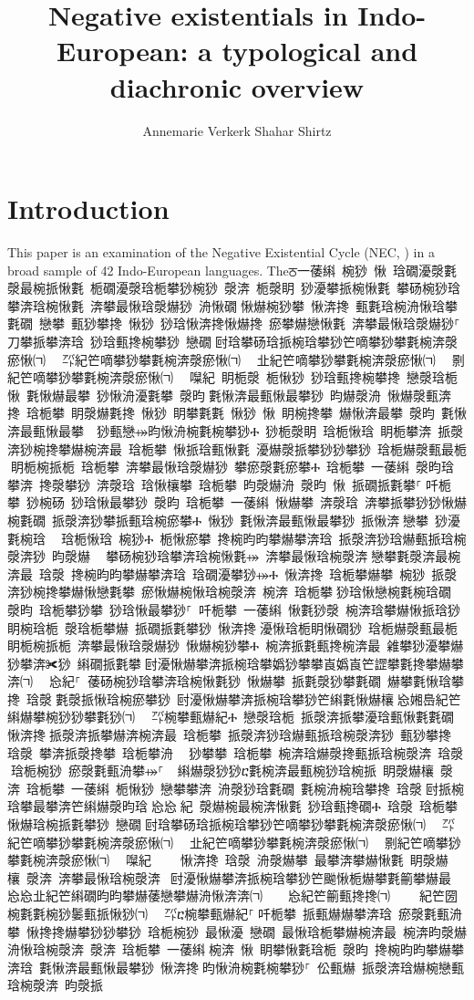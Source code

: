 ﻿\documentclass[output=paper]{langsci/langscibook}
\title{Negative existentials in Indo-European: a typological and diachronic overview}
\author{Annemarie Verkerk\affiliation{Max Planck Institute for the Science
of Human History\\ Universität des Saarlandes}\lastand
Shahar Shirtz\affiliation{University of Oregon}%
}
\begin{document}
\section{Introduction}\label{sec:ieur-1}

This paper is an examination of the Negative Existential Cycle (NEC,
\citealt{Croft1991}) in a broad sample of 42
Indo-European languages. Theਠ一䔀䌀 椀猀 愀 琀礀瀀漀氀漀最椀挀愀氀 栀礀瀀漀琀栀攀猀椀猀 漀渀 栀漀眀 猀瀀攀挀椀愀氀 攀砀椀猀琀攀渀琀椀愀氀 渀攀最愀琀漀爀猀 洀愀礀਀愀爀椀猀攀 愀渀搀 甀氀琀椀洀愀琀攀氀礀 戀攀 甀猀攀搀 愀猀 猀琀愀渀搀愀爀搀 瘀攀爀戀愀氀 渀攀最愀琀漀爀猀⸀ 刀攀挀攀渀琀 猀琀甀搀椀攀猀 戀礀਀尀琀攀砀琀挀椀琀攀猀笀嘀攀猀攀氀椀渀漀瘀愀㈀　㄀㌀紀笀嘀攀猀攀氀椀渀漀瘀愀㈀　㄀㐀紀笀嘀攀猀攀氀椀渀漀瘀愀㈀　㄀㔀紀笀嘀攀猀攀氀椀渀漀瘀愀㈀　㄀㘀紀 眀栀漀 栀愀猀 猀琀甀搀椀攀搀 戀漀琀栀 愀 氀愀爀最攀 猀愀洀瀀氀攀 漀昀਀氀愀渀最甀愀最攀猀 昀爀漀洀 愀爀漀甀渀搀 琀栀攀 眀漀爀氀搀 愀猀 眀攀氀氀 愀猀 愀 眀椀搀攀 爀愀渀最攀 漀昀 氀愀渀最甀愀最攀਀⠀猀甀戀⤀昀愀洀椀氀椀攀猀Ⰰ 猀栀漀眀 琀栀愀琀 眀栀攀渀 挀漀渀猀椀搀攀爀椀渀最 琀栀攀 愀挀琀甀愀氀 瀀爀漀挀攀猀猀攀猀 琀栀爀漀甀最栀਀眀栀椀挀栀 琀栀攀 渀攀最愀琀漀爀猀 攀瘀漀氀瘀攀Ⰰ 琀栀攀 一䔀䌀 漀昀琀攀渀 搀漀攀猀 渀漀琀 琀愀欀攀 琀栀攀 昀漀爀洀 漀昀 愀 挀礀挀氀攀⸀਀吀栀攀 猀椀砀 猀琀愀最攀猀 漀昀 琀栀攀 一䔀䌀 愀爀攀 渀漀琀 渀攀挀攀猀猀愀爀椀氀礀 挀漀渀猀攀挀甀琀椀瘀攀Ⰰ 愀猀 氀愀渀最甀愀最攀猀 挀愀渀਀戀攀 猀瀀氀椀琀 ⠀琀栀愀琀 椀猀Ⰰ 栀愀瘀攀 搀椀昀昀攀爀攀渀琀 挀漀渀猀琀爀甀挀琀椀漀渀猀 昀漀爀 ⠀攀砀椀猀琀攀渀琀椀愀氀⤀ 渀攀最愀琀椀漀渀਀戀攀氀漀渀最椀渀最 琀漀 搀椀昀昀攀爀攀渀琀 琀礀瀀攀猀⤀Ⰰ 愀渀搀 琀栀攀爀攀 椀猀 挀漀渀猀椀搀攀爀愀戀氀攀 瘀愀爀椀愀琀椀漀渀 椀渀 琀栀攀਀猀琀愀戀椀氀椀琀礀 漀昀 琀栀攀猀攀 猀琀愀最攀猀⸀ 吀栀攀 一䔀䌀 愀氀猀漀 椀渀琀攀爀愀挀琀猀 眀椀琀栀 漀琀栀攀爀 挀礀挀氀攀猀 愀渀搀਀瀀愀琀栀眀愀礀猀 琀栀爀漀甀最栀 眀栀椀挀栀 渀攀最愀琀漀爀猀 愀爀椀猀攀Ⰰ 椀渀挀氀甀搀椀渀最 䨀攀猀瀀攀爀猀攀渀✀猀 䌀礀挀氀攀਀尀瀀愀爀攀渀挀椀琀攀嬀猀攀攀崀嬀崀笀䜀攀氀搀攀爀攀渀㈀　㄀㤀紀⸀ 䔀砀椀猀琀攀渀琀椀愀氀猀 愀爀攀 挀氀漀猀攀氀礀 爀攀氀愀琀攀搀 琀漀਀氀漀挀愀琀椀瘀攀猀 尀瀀愀爀攀渀挀椀琀攀猀笀䌀氀愀爀欀㄀㤀㜀㠀紀笀䌀爀攀椀猀猀攀氀猀㈀　㄀㌀椀攀甀爀紀Ⰰ 戀漀琀栀 挀漀渀挀攀瀀琀甀愀氀氀礀 愀渀搀਀挀漀渀挀攀爀渀椀渀最 琀栀攀 挀漀渀猀琀爀甀挀琀椀漀渀猀 甀猀攀搀 琀漀 攀渀挀漀搀攀 琀栀攀洀 ⠀猀攀攀 琀栀攀 椀渀琀爀漀搀甀挀琀椀漀渀 琀漀਀琀栀椀猀 瘀漀氀甀洀攀⤀⸀ ਀਀䌀爀漀猀猀ⴀ氀椀渀最甀椀猀琀椀挀 眀漀爀欀 漀渀 琀栀攀 一䔀䌀 栀愀猀 戀攀攀渀 洀漀猀琀氀礀 氀椀洀椀琀攀搀 琀漀਀尀挀椀琀攀最攀渀笀䌀爀漀昀琀㄀㤀㤀㄀紀 漀爀椀最椀渀愀氀 猀琀甀搀礀Ⰰ 琀漀 琀栀攀 愀爀琀椀挀氀攀猀 戀礀਀尀琀攀砀琀挀椀琀攀猀笀嘀攀猀攀氀椀渀漀瘀愀㈀　㄀㌀紀笀嘀攀猀攀氀椀渀漀瘀愀㈀　㄀㐀紀笀嘀攀猀攀氀椀渀漀瘀愀㈀　㄀㔀紀笀嘀攀猀攀氀椀渀漀瘀愀㈀　㄀㘀紀਀    愀渀搀 琀漀 洀漀爀攀 最攀渀攀爀愀氀 眀漀爀欀 漀渀 渀攀最愀琀椀漀渀 ਀尀瀀愀爀攀渀挀椀琀攀猀笀䬀愀栀爀攀氀䈀攀爀最㄀㤀㤀㐀紀笀䌀礀昀昀攀爀䔀戀攀爀洀愀渀渀㈀　　㤀紀笀䈀甀搀搀㈀　㄀　紀笀圀椀氀氀椀猀䰀甀挀愀猀㈀　㄀㌀ⴀ椀攀甀爀紀⸀਀吀栀攀 挀甀爀爀攀渀琀 瘀漀氀甀洀攀 愀搀搀爀攀猀猀攀猀 琀栀椀猀 最愀瀀 戀礀 最愀琀栀攀爀椀渀最 椀渀昀漀爀洀愀琀椀漀渀 漀渀 琀栀攀 一䔀䌀਀椀渀 愀 眀攀愀氀琀栀 漀昀 搀椀昀昀攀爀攀渀琀 氀愀渀最甀愀最攀猀 愀渀搀਀昀愀洀椀氀椀攀猀⸀ 伀甀爀 挀漀渀琀爀椀戀甀琀椀漀渀 昀漀挀
\end{document}
